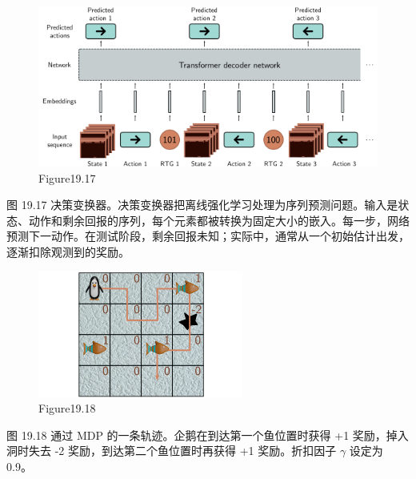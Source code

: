 \begin{figure}[ht!]
\centering
\includegraphics[width=0.7\linewidth]{png/chapter19/ReinforceDecisionTransformer.png}
\caption{Figure19.17}
\end{figure}
图 19.17 决策变换器。决策变换器把离线强化学习处理为序列预测问题。输入是状态、动作和剩余回报的序列，每个元素都被转换为固定大小的嵌入。每一步，网络预测下一动作。在测试阶段，剩余回报未知；实际中，通常从一个初始估计出发，逐渐扣除观测到的奖励。

\begin{figure}[ht!]
\centering
\includegraphics[width=0.7\linewidth]{png/chapter19/ReinforceProbReturn.png}
\caption{Figure19.18}
\end{figure}
图 19.18 通过 MDP 的一条轨迹。企鹅在到达第一个鱼位置时获得 +1 奖励，掉入洞时失去 -2 奖励，到达第二个鱼位置时再获得 +1 奖励。折扣因子 \(\gamma\) 设定为 0.9。